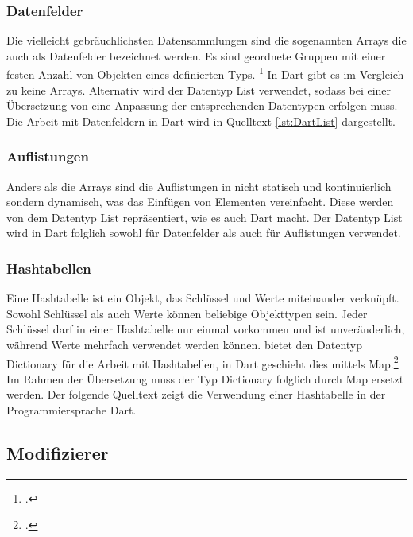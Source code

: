 \subsubsection{Datenfelder}

Die vielleicht gebräuchlichsten Datensammlungen sind die sogenannten \glq Arrays\grq{} die auch als Datenfelder bezeichnet werden.  Es sind geordnete Gruppen mit einer festen Anzahl von Objekten eines definierten Typs. \footcite[Vgl.][S. 110f]{Kühnel2019} In Dart gibt es im Vergleich zu \Csharp{} keine \glq Arrays\grq{}.  Alternativ  wird der Datentyp \glq List\grq{}  verwendet,  sodass bei einer Übersetzung von \Csharp{} eine Anpassung der entsprechenden Datentypen erfolgen muss.  Die Arbeit mit Datenfeldern in Dart wird in Quelltext \ref{lst:DartList} dargestellt.



\subsubsection{Auflistungen}
Anders als die \glq Arrays\grq{}  sind die Auflistungen in \Csharp{} nicht statisch und kontinuierlich sondern dynamisch, was das Einfügen von Elementen vereinfacht.   Diese werden von dem Datentyp \glq List\grq{} repräsentiert,  wie es auch Dart macht.  Der Datentyp \glq List\grq{}  wird in Dart folglich sowohl für Datenfelder als auch für Auflistungen verwendet.

\subsubsection{Hashtabellen}

Eine Hashtabelle ist ein Objekt, das Schlüssel und Werte miteinander verknüpft. Sowohl Schlüssel als auch Werte können beliebige Objekttypen sein.  Jeder Schlüssel darf in einer Hashtabelle nur einmal vorkommen und ist unveränderlich,  während Werte mehrfach verwendet werden können.  
\Csharp{} bietet den Datentyp Dictionary für die Arbeit mit Hashtabellen, in  Dart geschieht dies mittels Map.\footcite[Vgl. ][Abgerufen am \today]{GoogleFlutterTour2020} Im Rahmen der Übersetzung muss der Typ Dictionary folglich durch Map ersetzt werden.  Der folgende Quelltext zeigt die Verwendung einer Hashtabelle in der Programmiersprache Dart.



\subsection{Modifizierer}

